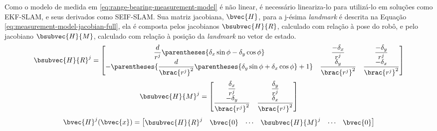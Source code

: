 Como o modelo de medida em \ref{eq:range-bearing-measurement-model} é não linear, é necessário lineariza-lo para utilizá-lo em soluções como EKF-SLAM, e seus derivados como SEIF-SLAM. Sua matriz jacobiana, $\bvec{H}$, para a j-ésima \textit{landmark} é descrita na Equação \ref{eq:measurement-model-jacobian-full}, 
ela é composta pelos jacobianos $\bsubvec{H}{R}$, calculado com relação à pose do robô, e pelo jacobiano $\bsubvec{H}{M}$, calculado com relação à 
posição da \textit{landmark} no vetor de estado.
\renewcommand{\arraystretch}{2}
\begin{equation}
  \bsubvec{H}{R}^j = \begin{bmatrix}
    \dfrac{d}{r^j}\parentheses{\delta_x \sin\phi - \delta_y \cos\phi} &  \dfrac{-\delta_x}{r^j} & \dfrac{-\delta_y}{r^j}\\
    -\parentheses{\dfrac{d}{\brac{r^j}^2}\parentheses{\delta_y \sin\phi + \delta_x \cos\phi} + 1} & \dfrac{\delta_y}{\brac{r^j}^2} & \dfrac{-\delta_x}{\brac{r^j}^2}
    \end{bmatrix}
  \label{eq:measurement-model-jacobian-robot-part}
\end{equation}
\renewcommand{\arraystretch}{2}
\begin{equation}
  \bsubvec{H}{M}^j = \begin{bmatrix}
      \dfrac{\delta_x}{r^j} & \dfrac{\delta_y}{r^j} \\
      \dfrac{-\delta_y}{\brac{r^j}^2} & \dfrac{\delta_x}{\brac{r^j}^2}
    \end{bmatrix}
  \label{eq:measurement-model-jacobian-map-part}
\end{equation}
\renewcommand{\arraystretch}{1}
\begin{equation}
  \bvec{H}^j(\bvec{x}) = \begin{bmatrix}
    \bsubvec{H}{R}^j & \bvec{0} & \cdots & \bsubvec{H}{M}^j & \cdots & \bvec{0}
  \end{bmatrix} 
  \label{eq:measurement-model-jacobian-full}
\end{equation}

